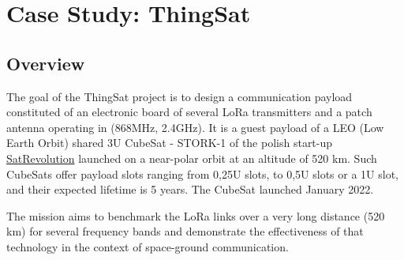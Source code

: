 \section{Case Study: ThingSat}
\label{sec:case-study}

\subsection{Overview}



The goal of the ThingSat project is to design a communication payload
constituted of an electronic board of several LoRa transmitters and a patch
antenna operating in (868MHz, 2.4GHz). It is a guest payload of a LEO (Low Earth
Orbit) shared 3U CubeSat - STORK-1 of the polish start-up
\href{https://www.satrevolution.com/}{SatRevolution} launched on a near-polar
orbit at an altitude of 520 km.
Such CubeSats offer payload slots ranging from 0,25U slots, to 0,5U slots or a 1U slot, and their expected lifetime is 5 years.
The CubeSat launched January 2022. 


The mission aims to benchmark the LoRa links over a very long distance (520 km)
for several frequency bands and demonstrate the effectiveness of that technology
in the context of space-ground communication.

